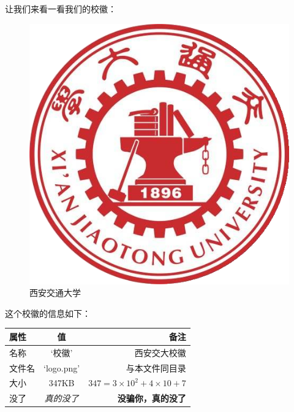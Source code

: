 让我们来看一看我们的校徽：

\begin{figure}
\centering
\includegraphics{./logo.png}
\caption{西安交通大学}
\end{figure}

这个校徽的信息如下：

\begin{longtable}[]{@{}lcr@{}}
\toprule
属性 & 值 & 备注\tabularnewline
\midrule
\endhead
名称 & `校徽' & 西安交大校徽\tabularnewline
文件名 & `logo.png' & 与本文件同目录\tabularnewline
大小 & 347KB & \(347 = 3\times10^2 + 4\times10 + 7\)\tabularnewline
没了 & \emph{真的没了} & \textbf{没骗你，真的没了}\tabularnewline
\bottomrule
\end{longtable}
